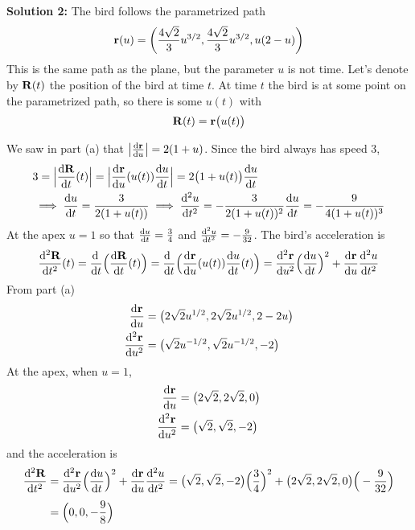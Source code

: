 \begin{solution}
	\textbf{Solution 2:}
	\qquad
	The bird follows the parametrized path 
	\begin{equation*}
	\mathbf{r}(u)=\left(\frac{4\sqrt{2}}{3}u^{3/2},\frac{4\sqrt{2}}{3}u^{3/2},
	u(2-u)\right)
	\end{equation*}
	This is the same path as the plane, but the parameter
	$u$ is not time. Let's denote by $\mathbf{R}(t)$ the position of 
	the bird at time $t$. At time $t$ the bird is at some point on
	the parametrized path, so there is some $u(t)$ with
	\begin{equation*}
	\mathbf{R}(t) = \mathbf{r}\big(u(t)\big)
	\end{equation*} 
	
	We saw in part (a) that $\big|\diff{\vr}{u}\big|
	=2(1+u)$. Since the bird always has speed $3$,
	\begin{align*}
	&3=\Big|\diff{\vR}{t}(t)\Big|=\Big|\diff{\vr}{u}(u(t))\diff{u}{t}\Big|
	=2\big(1+u(t)\big)\diff{u}{t} \\
	&\implies \diff{u}{t}=\frac{3}{2(1+u(t))}
	\implies \difftwo{u}{t}=-\frac{3}{2(1+u(t))^2}\diff{u}{t}
	=-\frac{9}{4(1+u(t))^3}
	\end{align*}
	At the apex $u=1$ so that $\diff{u}{t}=\frac{3}{4}$ and 
	$\difftwo{u}{t}=-\frac{9}{32}$. The bird's acceleration is
	$$
	\difftwo{\vR}{t}(t)=\diff{}{t}\Big(\diff{\vR}{t}(t)\Big)
	=\diff{\hfill}{t}\Big(\diff{\vr}{u}(u(t))\diff{u}{t}(t)\Big)
	=\difftwo{\vr}{u}\Big(\diff{u}{t}\Big)^2
	+\diff{\vr}{u}\difftwo{u}{t}
	$$
	From part (a)
	\begin{align*}
	\diff{\vr}{u}&=\big(2\sqrt{2}u^{1/2},2\sqrt{2}u^{1/2},2-2u\big)\\
	\difftwo{\vr}{u}&=\big(\sqrt{2}u^{-1/2},\sqrt{2}u^{-1/2},-2\big)\\
	\end{align*}
	At the apex, when $u=1$,
	\begin{align*}
	\diff{\vr}{u}&=\big(2\sqrt{2},2\sqrt{2},0\big)\\
	\difftwo{\vr}{u}&=\big(\sqrt{2},\sqrt{2},-2\big)\\
	\end{align*}
	and the acceleration is
	\begin{align*}
	\difftwo{\vR}{t}
	&=\difftwo{\vr}{u}\Big(\diff{u}{t}\Big)^2
	+\diff{\vr}{u}\difftwo{u}{t}
	=\big(\sqrt{2},\sqrt{2},-2\big)\Big(\frac{3}{4}\Big)^2
	+\big(2\sqrt{2},2\sqrt{2},0\big)\Big(-\frac{9}{32}\Big) \\[0.05in]
	&=\Big(0,0,-\frac{9}{8}\Big)
	\end{align*}
\end{solution}